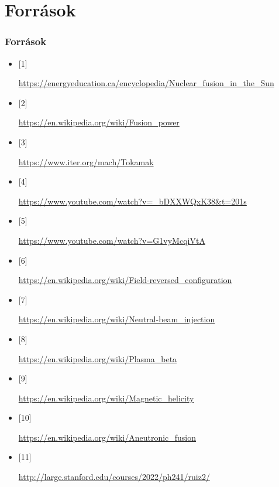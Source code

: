 \documentclass{beamer}
\begin{document}
\section{Források}
\begin{frame}
    \frametitle{Források}
    \footnotesize
    \begin{itemize}
        \item \hypertarget{1}{\small[1]}\url{https://energyeducation.ca/encyclopedia/Nuclear_fusion_in_the_Sun}
        \item \hypertarget{2}{\small[2]}\url{https://en.wikipedia.org/wiki/Fusion_power}
        \item \hypertarget{3}{\small[3]}\url{https://www.iter.org/mach/Tokamak}
        \item \hypertarget{4}{\small[4]}\url{https://www.youtube.com/watch?v=_bDXXWQxK38&t=201s}
        \item \hypertarget{5}{\small[5]}\url{https://www.youtube.com/watch?v=G1vyMcqiVtA}
        \item \hypertarget{6}{\small[6]}\url{https://en.wikipedia.org/wiki/Field-reversed_configuration}
        \item \hypertarget{7}{\small[7]}\url{https://en.wikipedia.org/wiki/Neutral-beam_injection}
        \item \hypertarget{8}{\small[8]}\url{https://en.wikipedia.org/wiki/Plasma_beta}
        \item \hypertarget{9}{\small[9]}\url{https://en.wikipedia.org/wiki/Magnetic_helicity}
        \item \hypertarget{10}{\small[10]}\url{https://en.wikipedia.org/wiki/Aneutronic_fusion}
        \item \hypertarget{11}{\small[11]}\url{http://large.stanford.edu/courses/2022/ph241/ruiz2/}
    \end{itemize}
\end{frame}
\end{document}
